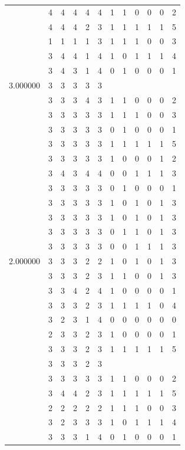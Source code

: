 \documentclass[]{book}
\theoremstyle{definition}
\theoremstyle{definition}
\theoremstyle{definition}
\theoremstyle{remark}
\begin{document}
\begin{table}
{\begin{tabular}[t]{rrrrrrrrrrrr}
 & 4 & 4 & 4 & 4 & 4 & 1 & 1 & 0 & 0 & 0 & 2\\
 & 4 & 4 & 4 & 2 & 3 & 1 & 1 & 1 & 1 & 1 & 5\\
 & 1 & 1 & 1 & 1 & 3 & 1 & 1 & 1 & 0 & 0 & 3\\
 & 3 & 4 & 4 & 1 & 4 & 1 & 0 & 1 & 1 & 1 & 4\\
 & 3 & 4 & 3 & 1 & 4 & 0 & 1 & 0 & 0 & 0 & 1\\
3.000000 & 3 & 3 & 3 & 3 & 3 &  &  &  &  &  & \\
 & 3 & 3 & 3 & 4 & 3 & 1 & 1 & 0 & 0 & 0 & 2\\
 & 3 & 3 & 3 & 3 & 3 & 1 & 1 & 1 & 0 & 0 & 3\\
 & 3 & 3 & 3 & 3 & 3 & 0 & 1 & 0 & 0 & 0 & 1\\
 & 3 & 3 & 3 & 3 & 3 & 1 & 1 & 1 & 1 & 1 & 5\\
 & 3 & 3 & 3 & 3 & 3 & 1 & 0 & 0 & 0 & 1 & 2\\
 & 3 & 4 & 3 & 4 & 4 & 0 & 0 & 1 & 1 & 1 & 3\\
 & 3 & 3 & 3 & 3 & 3 & 0 & 1 & 0 & 0 & 0 & 1\\
 & 3 & 3 & 3 & 3 & 3 & 1 & 0 & 1 & 0 & 1 & 3\\
 & 3 & 3 & 3 & 3 & 3 & 1 & 0 & 1 & 0 & 1 & 3\\
 & 3 & 3 & 3 & 3 & 3 & 0 & 1 & 1 & 0 & 1 & 3\\
 & 3 & 3 & 3 & 3 & 3 & 0 & 0 & 1 & 1 & 1 & 3\\
2.000000 & 3 & 3 & 3 & 2 & 2 & 1 & 0 & 1 & 0 & 1 & 3\\
 & 3 & 3 & 3 & 2 & 3 & 1 & 1 & 0 & 0 & 1 & 3\\
 & 3 & 3 & 4 & 2 & 4 & 1 & 0 & 0 & 0 & 0 & 1\\
 & 3 & 3 & 3 & 2 & 3 & 1 & 1 & 1 & 1 & 0 & 4\\
 & 3 & 2 & 3 & 1 & 4 & 0 & 0 & 0 & 0 & 0 & 0\\
 & 2 & 3 & 3 & 2 & 3 & 1 & 0 & 0 & 0 & 0 & 1\\
 & 3 & 3 & 3 & 2 & 3 & 1 & 1 & 1 & 1 & 1 & 5\\
 & 3 & 3 & 3 & 2 & 3 &  &  &  &  &  & \\
 & 3 & 3 & 3 & 3 & 3 & 1 & 1 & 0 & 0 & 0 & 2\\
 & 3 & 4 & 4 & 2 & 3 & 1 & 1 & 1 & 1 & 1 & 5\\
 & 2 & 2 & 2 & 2 & 2 & 1 & 1 & 1 & 0 & 0 & 3\\
 & 3 & 2 & 3 & 3 & 3 & 1 & 0 & 1 & 1 & 1 & 4\\
 & 3 & 3 & 3 & 1 & 4 & 0 & 1 & 0 & 0 & 0 & 1\\

\end{tabular}}
\end{table}
\end{document}
